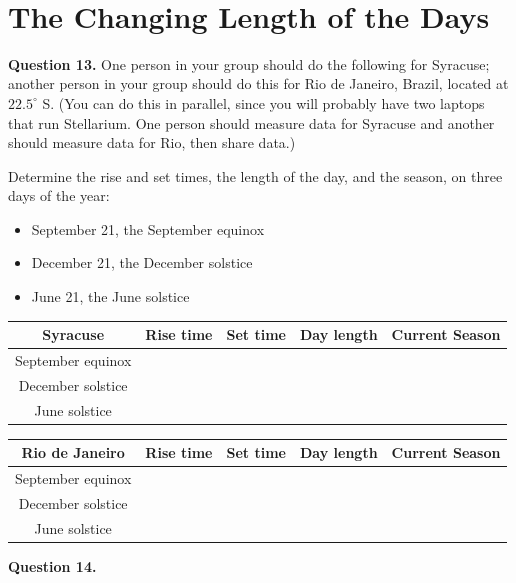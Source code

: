 \documentclass[11pt]{article}
\begin{document}
\vspace*{2cm}
\hrulefill\\
\newpage
\section{The Changing Length of the Days}

\textbf{Question 13.}
One person in your group should do the following for Syracuse; another person in your group should do 
this for Rio de Janeiro, Brazil, located at $22.5^\circ$ S. (You can do this in parallel, since you will probably 
have two laptops that run Stellarium. One person should measure data for Syracuse and another should measure data for Rio, then share data.) 

Determine the rise and set times, the length of the day, and the season, on three days of the year:

\begin{itemize}
\item September 21, the September equinox
\item December 21, the December solstice 
\item June 21, the June solstice 
\end{itemize}

\begin{center}


\begin{tabular}{|c| c |c|c|c|}
\hline
\Large Syracuse \normalsize
 & Rise time & Set time & Day length & Current Season\\
\hline
September equinox & & & & \\
\hline
December solstice & & & & \\
\hline
June solstice & & & & \\
\hline
\end{tabular}
\normalsize
\end{center}

\bigskip

\begin{center}
\begin{tabular}{|c| c |c|c|c|}
\hline
\Large Rio de Janeiro \normalsize
 & Rise time & Set time & Day length & Current Season\\
\hline
September equinox & & & & \\
\hline
December solstice & & & & \\
\hline
June solstice & & & & \\
\hline
\end{tabular}
\normalsize
\end{center}
\textbf{Question 14.}
\end{document}
